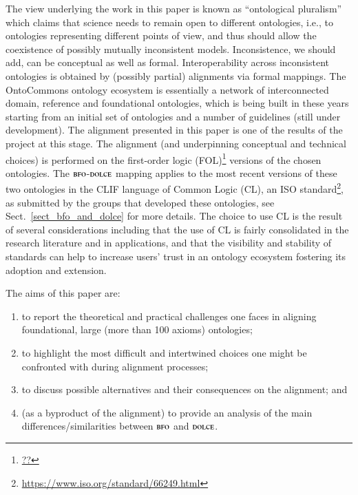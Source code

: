 \documentclass[ao]{iosart2x}
\newcommand{\dolce}{{\textsc{dolce}}}
\newcommand{\bfo}{{\textsc{bfo}}}
\newcommand{\emmo}{{\textsc{emmo}}}
\begin{document}
\medskip
The view underlying the work in this paper is known as ``ontological pluralism'' which claims that science needs to remain open to different ontologies, i.e., to ontologies representing different points of view, and thus should allow the coexistence of possibly mutually inconsistent models. Inconsistence, we should add, can be conceptual as well as formal. Interoperability across inconsistent ontologies is obtained by (possibly partial) alignments via formal mappings. The OntoCommons ontology ecosystem is essentially a network of interconnected domain, reference and foundational ontologies, which is being built in these years starting from an initial set of ontologies and a number of guidelines (still under development). The alignment presented in this paper is one of the results of the project at this stage. 
The alignment (and underpinning conceptual and technical choices) is performed on the first-order logic (FOL)\footnote{\url{??}} versions of the chosen ontologies. 
The $\bfo$-$\dolce$ mapping applies to the most recent versions of these two ontologies in the CLIF language of Common Logic (CL), an ISO standard\footnote{\url{https://www.iso.org/standard/66249.html}}, as submitted by the groups that developed these ontologies, see Sect.~\ref{sect_bfo_and_dolce} for more details. 
The choice to use CL is the result of several considerations including that the use of CL is fairly consolidated in the research literature and in applications, and that the visibility and stability of standards can help to increase users' trust in an ontology ecosystem fostering its adoption and extension.

\medskip 
The aims of this paper are:  
\begin{enumerate}[$(i)$]
\item to report the theoretical and practical challenges one faces in aligning foundational, large (more than 100 axioms) ontologies; 
\item to highlight the most difficult and intertwined choices one might be confronted with during alignment processes;
\item to discuss possible alternatives and their consequences on the alignment; and 
\item (as a byproduct of the alignment) to provide an analysis of the main differences/similarities between $\bfo$ and $\dolce$.
\end{enumerate}
\end{document}
